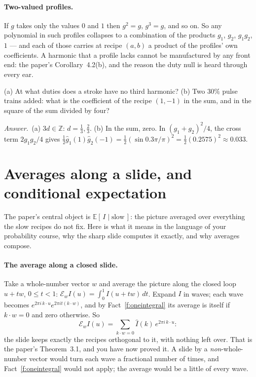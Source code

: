 \documentclass[10pt]{article}
\theoremstyle{plain}
\theoremstyle{definition}
\newcommand{\answer}{\par\smallskip\noindent\textit{Answer.}\ }
\newcommand{\Z}{\mathbb{Z}}
\newcommand{\E}{\mathbb{E}}
\begin{document}
\paragraph{Two-valued profiles.}
If $g$ takes only the values $0$ and $1$ then $g^2=g$, $g^3=g$, and so on.
So any polynomial in such profiles collapses to a combination of the
products $g_1$, $g_2$, $g_1g_2$, $1$ --- and each of those carries at recipe
$(a,b)$ a product of the profiles' own coefficients. A harmonic that a
profile lacks cannot be manufactured by any front end: the paper's
Corollary~4.2(b), and the reason the duty null is heard through every ear.

\begin{checkyourself}
(a) At what duties does a stroke have no third harmonic? (b) Two $30\%$
pulse trains added: what is the coefficient of the recipe $(1,-1)$ in the
sum, and in the square of the sum divided by four?
\answer (a) $3d\in\Z$: $d=\tfrac13,\tfrac23$. (b) In the sum, zero. In
$(g_1+g_2)^2/4$, the cross term $2g_1g_2/4$ gives
$\tfrac12\hat g_1(1)\hat g_2(-1)=\tfrac12(\sin0.3\pi/\pi)^2=\tfrac12(0.2575)^2\approx0.033$.
\end{checkyourself}

\section{Averages along a slide, and conditional expectation}
\label{p:average}

\begin{why}
The paper's central object is $\E[\,I\mid\text{slow}\,]$: the picture
averaged over everything the slow recipes do not fix. Here is what it means
in the language of your probability course, why the sharp slide computes
it exactly, and why averages compose.
\end{why}

\paragraph{The average along a closed slide.}
Take a whole-number vector $w$ and average the picture along the closed
loop $u+tw$, $0\le t<1$:
$\mathcal E_wI(u)=\int_0^1I(u+tw)\,dt$. Expand $I$ in waves; each wave
becomes $e^{2\pi i\,k\cdot u}e^{2\pi it(k\cdot w)}$, and by
Fact~\ref{f:oneintegral} its average is itself if $k\cdot w=0$ and zero
otherwise. So
\[
  \mathcal E_wI(u)=\sum_{k\cdot w=0}\hat I(k)\,e^{2\pi i\,k\cdot u}:
\]
the slide keeps exactly the recipes orthogonal to it, with nothing left
over. That is the paper's Theorem~3.1, and you have now proved it. A slide
by a \emph{non}-whole-number vector would turn each wave a fractional
number of times, and Fact~\ref{f:oneintegral} would not apply; the average
would be a little of every wave.
\end{document}
